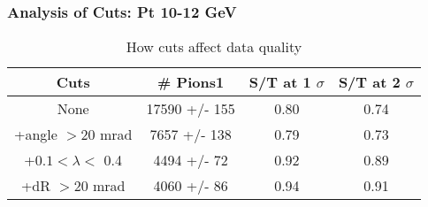 \frame
{
\frametitle{Analysis of Cuts: Pt 10-12 GeV}
\begin{table}
\caption{How cuts affect data quality}
\centering
\begin{tabular}{c c c c}
\hline\hline
Cuts & \# Pions1 & S/T at 1 $\sigma$ & S/T at 2 $\sigma$ \\ [0.5ex]
\hline
None & 17590 +/-  155 & 0.80 & 0.74 \\ %
+angle $> 20$ mrad & 7657 +/-  138 & 0.79 & 0.73 \\ %
+$0.1 < \lambda <$ 0.4 & 4494 +/-   72 & 0.92 & 0.89 \\ %
+dR $> 20$ mrad & 4060 +/-   86 & 0.94 & 0.91 \\ %
[1ex]
\hline
\end{tabular}
\label{table:nonlin}
\end{table}
}
